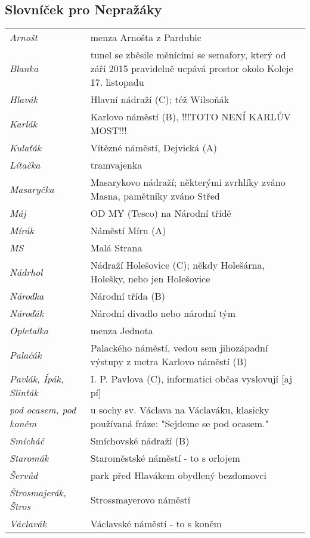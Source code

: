 \subsection{Slovníček pro Nepražáky}

\begin{tabular}{l p{8.5cm}}
    \textit{Arnošt} & menza Arnošta z Pardubic \\
    \textit{Blanka} &  tunel se zběsile měnícími se semafory, který od září 2015 pravidelně ucpává prostor okolo Koleje 17. listopadu \\
    \textit{Hlavák} &  Hlavní nádraží (C); též Wilsoňák \\
    \textit{Karlák} &  Karlovo náměstí (B), !!!TOTO NENÍ KARLŮV MOST!!! \\
    \textit{Kulaťák} &  Vítězné náměstí, Dejvická (A) \\
    \textit{Lítačka} &  tramvajenka \\
    \textit{Masaryčka} &  Masarykovo nádraží; některými zvrhlíky zváno Masna, pamětníky zváno Střed \\
    \textit{Máj} &  OD MY (Tesco) na Národní třídě \\
    \textit{Mírák} &  Náměstí Míru (A) \\
    \textit{MS} &  Malá Strana \\
    \textit{Nádrhol} &  Nádraží Holešovice (C); někdy Holešárna, Holešky, nebo jen Holešovice \\
    \textit{Národka} &  Národní třída (B) \\
    \textit{Nároďák} &  Národní divadlo nebo národní tým \\
    \textit{Opletalka} &  menza Jednota \\
    \textit{Palačák} &  Palackého náměstí, vedou sem jihozápadní výstupy z metra Karlovo náměstí (B) \\
    \textit{Pavlák, Ípák, Slinták} & I. P. Pavlova (C), informatici občas vyslovují [aj pí] \\
    \textit{pod ocasem, pod koněm} & u sochy sv. Václava na Václaváku, klasicky používaná fráze: "Sejdeme se pod ocasem." \\
    \textit{Smícháč} &  Smíchovské nádraží (B) \\
    \textit{Staromák} &  Staroměstské náměstí - to s orlojem \\
    \textit{Šervůd} &  park před Hlavákem obydlený bezdomovci \\
    \textit{Štrosmajerák, Štros} & Strossmayerovo náměstí \\
    \textit{Václavák} &  Václavské náměstí - to s koněm
\end{tabular}